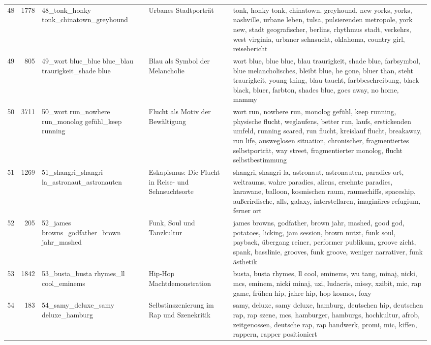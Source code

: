 \begin{longtable}{rrlll}
48 & 1778 & 48\_tonk\_honky tonk\_chinatown\_greyhound & Urbanes Stadtporträt & tonk, honky tonk, chinatown, greyhound, new yorks, yorks, nashville, urbane leben, tulsa, pulsierenden metropole, york new, stadt geografischer, berlins, rhythmus stadt, verkehrs, west virginia, urbaner sehnsucht, oklahoma, country girl, reisebericht \\
49 & 805 & 49\_wort blue\_blue blue\_blau traurigkeit\_shade blue & Blau als Symbol der Melancholie & wort blue, blue blue, blau traurigkeit, shade blue, farbsymbol, blue melancholisches, bleibt blue, he gone, bluer than, steht traurigkeit, young thing, blau taucht, farbbeschreibung, black black, bluer, farbton, shades blue, goes away, no home, mammy \\
50 & 3711 & 50\_wort run\_nowhere run\_monolog gefühl\_keep running & Flucht als Motiv der Bewältigung & wort run, nowhere run, monolog gefühl, keep running, physische flucht, weglaufens, better run, laufs, erstickenden umfeld, running scared, run flucht, kreislauf flucht, breakaway, run life, ausweglosen situation, chronischer, fragmentiertes selbstporträt, way street, fragmentierter monolog, flucht selbstbestimmung \\
51 & 1269 & 51\_shangri\_shangri la\_astronaut\_astronauten & Eskapismus: Die Flucht in Reise- und Sehnsuchtsorte & shangri, shangri la, astronaut, astronauten, paradies ort, weltraums, wahre paradies, aliens, ersehnte paradies, karawane, balloon, kosmischen raum, raumschiffs, spaceship, außerirdische, alls, galaxy, interstellaren, imaginäres refugium, ferner ort \\
52 & 205 & 52\_james browns\_godfather\_brown jahr\_mashed & Funk, Soul und Tanzkultur & james browns, godfather, brown jahr, mashed, good god, potatoes, licking, jam session, brown nutzt, funk soul, payback, übergang reiner, performer publikum, groove zieht, spank, basslinie, grooves, funk groove, weniger narrativer, funk ästhetik \\
53 & 1842 & 53\_busta\_busta rhymes\_ll cool\_eminems & Hip‑Hop Machtdemonstration & busta, busta rhymes, ll cool, eminems, wu tang, minaj, nicki, mcs, eminem, nicki minaj, uzi, ludacris, missy, xzibit, mic, rap game, frühen hip, jahre hip, hop kosmos, foxy \\
54 & 183 & 54\_samy\_deluxe\_samy deluxe\_hamburg & Selbstinszenierung im Rap und Szenekritik & samy, deluxe, samy deluxe, hamburg, deutschen hip, deutschen rap, rap szene, mcs, hamburger, hamburgs, hochkultur, afrob, zeitgenossen, deutsche rap, rap handwerk, promi, mic, kiffen, rappern, rapper positioniert \\

\end{longtable}

